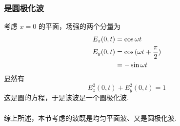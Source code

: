 \documentclass[UTF8,linespread=1.236]{ctexart}
\begin{document}
\subsubsection{是圆极化波}
考虑 $x = 0$ 的平面，场强的两个分量为
\begin{align}
E_z(0,t) &= \cos{\omega t} \\
E_y(0,t) &= \cos{(\omega t + {\pi \over 2})} \notag \\
&= -\sin{\omega t}
\end{align}
显然有
\begin{equation}
    E_z^2(0,t) + E_y^2(0,t) = 1
\end{equation}
这是圆的方程，于是该波是一个圆极化波.

\subsubsection*{}

综上所述，本节考虑的波既是均匀平面波、又是圆极化波.

\clearpage
\end{document}
